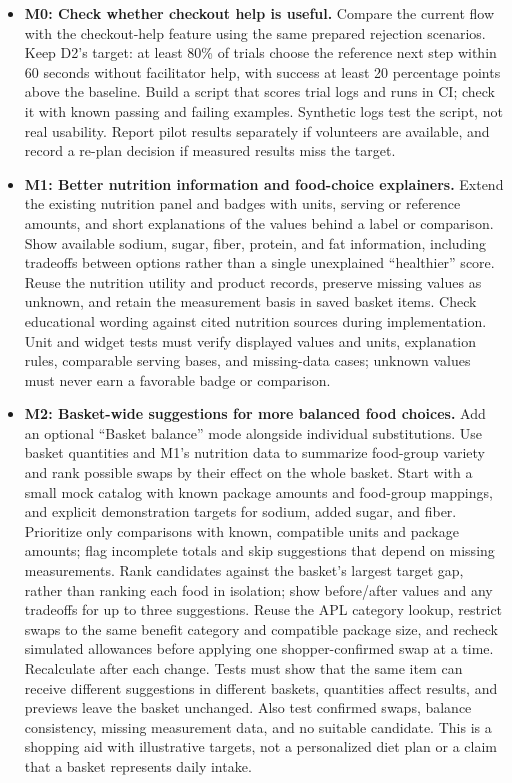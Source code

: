 \documentclass[sigconf]{acmart}
\begin{document}
\begin{itemize}
  \item \textbf{M0: Check whether checkout help is useful.}
  Compare the current flow with the checkout-help feature using the same
  prepared rejection scenarios. Keep D2's target: at least 80\% of trials
  choose the reference next step within 60 seconds without facilitator help,
  with success at least 20 percentage points above the baseline. Build a script
  that scores trial logs and runs in CI; check it with known passing and failing
  examples.
  Synthetic logs test the script, not real usability. Report pilot results
  separately if volunteers are available, and record a re-plan decision if
  measured results miss the target.

  \item \textbf{M1: Better nutrition information and food-choice explainers.}
  Extend the existing nutrition panel and badges with units, serving or
  reference amounts, and short explanations of the values behind a label or
  comparison. Show available sodium, sugar, fiber, protein, and fat information,
  including tradeoffs between options rather than a single unexplained
  ``healthier'' score. Reuse the nutrition utility and product records, preserve
  missing values as unknown, and retain the measurement basis in saved basket
  items. Check educational wording against cited nutrition sources during
  implementation. Unit and widget tests must verify displayed values and units,
  explanation rules, comparable serving bases, and missing-data cases; unknown
  values must never earn a favorable badge or comparison.

  \item \textbf{M2: Basket-wide suggestions for more balanced food choices.}
  Add an optional ``Basket balance'' mode alongside individual substitutions.
  Use basket quantities and M1's nutrition data to summarize food-group variety
  and rank possible swaps by their effect on the whole basket. Start with a
  small mock catalog with known package amounts and food-group mappings, and
  explicit demonstration targets for sodium, added sugar, and fiber. Prioritize
  only comparisons with known, compatible units and package amounts; flag
  incomplete totals and skip suggestions that depend on missing measurements.
  Rank candidates against
  the basket's largest target gap, rather than ranking each food in isolation;
  show before/after values and any tradeoffs for up to three suggestions.
  Reuse the APL category lookup, restrict swaps to the same benefit category
  and compatible package size, and recheck simulated allowances before applying
  one shopper-confirmed swap at a time. Recalculate after each change. Tests
  must show that the same item can receive different suggestions in different
  baskets, quantities affect results, and previews leave the basket unchanged.
  Also test confirmed swaps, balance consistency, missing measurement data,
  and no suitable candidate. This is a shopping aid with illustrative targets,
  not a personalized diet plan or a claim that a basket represents daily intake.


\end{itemize}
\end{document}
